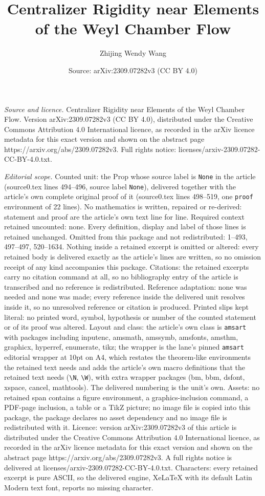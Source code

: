\documentclass[10pt,a4paper]{amsart}
\title[Centralizer Rigidity near Elements of the Weyl Chamber Flow]{Centralizer Rigidity near Elements of the Weyl Chamber Flow}
\author{Zhijing Wendy Wang}
\date{Source: arXiv:2309.07282v3 (CC BY 4.0)}
\begin{document}
\maketitle

\noindent\emph{Source and licence.} Centralizer Rigidity near Elements of the Weyl Chamber Flow. Version arXiv:2309.07282v3 (CC BY 4.0), distributed under the Creative Commons Attribution 4.0 International licence, as recorded in the arXiv licence metadata for this exact version and shown on the abstract page https://arxiv.org/abs/2309.07282v3. Full rights notice: licenses/arxiv-2309.07282-CC-BY-4.0.txt.\par\smallskip

\noindent\textit{Editorial scope.} Counted unit: the Prop whose source label is \texttt{None} in the article (source0.tex lines 494--496, source label \texttt{None}), delivered together with the article's own complete original proof of it (source0.tex lines 498--519, one \texttt{proof} environment of 22 lines). No mathematics is written, repaired or re-derived: statement and proof are the article's own text line for line. Required context retained uncounted: none. Every definition, display and label of those lines is retained unchanged. Omitted from this package and not redistributed: 1--493, 497--497, 520--1634. Nothing inside a retained excerpt is omitted or altered: every retained body is delivered exactly as the article's lines are written, so no omission receipt of any kind accompanies this package. Citations: the retained excerpts carry no citation command at all, so no bibliography entry of the article is transcribed and no reference is redistributed. Reference adaptation: none was needed and none was made; every reference inside the delivered unit resolves inside it, so no unresolved reference or citation is produced. Printed slips kept literal: no printed word, symbol, hypothesis or number of the counted statement or of its proof was altered. Layout and class: the article's own class is \texttt{amsart} with packages including inputenc, amsmath, amssymb, amsfonts, amsthm, graphicx, hyperref, enumerate, tikz; the wrapper is the lane's pinned \texttt{amsart} editorial wrapper at 10pt on A4, which restates the theorem-like environments the retained text needs and adds the article's own macro definitions that the retained text needs (\texttt{\textbackslash N}, \texttt{\textbackslash W}), with extra wrapper packages (bm, bbm, dsfont, xspace, cancel, mathtools). The delivered numbering is the unit's own. Assets: no retained span contains a figure environment, a graphics-inclusion command, a PDF-page inclusion, a table or a TikZ picture; no image file is copied into this package, the package declares no asset dependency and no image file is redistributed with it. Licence: version arXiv:2309.07282v3 of this article is distributed under the Creative Commons Attribution 4.0 International licence, as recorded in the arXiv licence metadata for this exact version and shown on the abstract page https://arxiv.org/abs/2309.07282v3. A full rights notice is delivered at licenses/arxiv-2309.07282-CC-BY-4.0.txt. Characters: every retained excerpt is pure ASCII, so the delivered engine, XeLaTeX with its default Latin Modern text font, reports no missing character.
\end{document}
